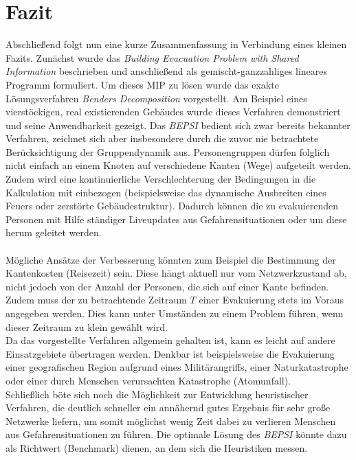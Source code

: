 \documentclass[a4paper, 11pt]{scrreprt}
\begin{document}
\chapter{Fazit}
\label{sec:fazit}
Abschließend folgt nun eine kurze Zusammenfassung in Verbindung eines kleinen Fazits.
Zunächst wurde das \textit{Building Evacuation Problem with Shared Information} beschrieben
und anschließend als gemischt-ganzzahliges lineares Programm formuliert.
Um dieses MIP zu lösen wurde das exakte Lösungsverfahren \textit{Benders Decomposition}
vorgestellt. Am Beispiel eines vierstöckigen, real existierenden Gebäudes wurde dieses
Verfahren demonstriert und seine Anwendbarkeit gezeigt.
Das \textit{BEPSI} bedient sich zwar bereits bekannter Verfahren, zeichnet sich aber
insbesondere durch die zuvor nie betrachtete Berücksichtigung der Gruppendynamik aus.
Personengruppen dürfen folglich nicht einfach an einem Knoten auf verschiedene Kanten
(Wege) aufgeteilt werden.
Zudem wird eine kontinuierliche Verschlechterung der Bedingungen in die Kalkulation
mit einbezogen (beispielsweise das dynamische Ausbreiten eines Feuers oder zerstörte
Gebäudestruktur). Dadurch können die zu evakuierenden Personen mit Hilfe ständiger
Liveupdates aus Gefahrensituationen oder um diese herum geleitet werden.\\
\\
Mögliche Ansätze der Verbesserung könnten zum Beispiel die Bestimmung der Kantenkosten
(Reisezeit) sein. Diese hängt aktuell nur vom Netzwerkzustand ab, nicht jedoch von der
Anzahl der Personen, die sich auf einer Kante befinden. Zudem muss der zu betrachtende
Zeitraum $T$ einer Evakuierung stets im Voraus angegeben werden. Dies kann unter Umständen
zu einem Problem führen, wenn dieser Zeitraum zu klein gewählt wird.\\
Da das vorgestellte Verfahren allgemein gehalten ist, kann es leicht auf andere
Einsatzgebiete übertragen werden. Denkbar ist beispielsweise die Evakuierung einer
geografischen Region aufgrund eines Militärangriffs, einer Naturkatastrophe oder
einer durch Menschen verursachten Katastrophe (Atomunfall).\\
Schließlich böte sich noch die Möglichkeit zur Entwicklung heuristischer Verfahren,
die deutlich schneller ein annähernd gutes Ergebnis für sehr große Netzwerke liefern, um somit
möglichst wenig Zeit dabei zu verlieren Menschen aus Gefahrensituationen zu führen.
Die optimale Lösung des \textit{BEPSI} könnte dazu als Richtwert (Benchmark) dienen, an dem
sich die Heuristiken messen.


\newpage
\singlespacing



\end{document}
